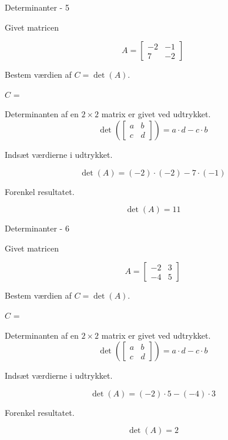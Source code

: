 \documentclass{article}
\begin{document}
\begin{exercise}{Determinanter - 5}
	
	Givet matricen
	
	\[
	A = \left[\begin{array}{rr}
	-2 & -1 \\ 
	7 & -2 
	\end{array} \right]
	\]
	
	Bestem værdien af $C = \det(A)$.
	
	$C$ = 
	
	\hint
	Determinanten af en $2 \times 2$ matrix er givet ved udtrykket.
	\[
	\det \left( \left[\begin{array}{rr}
	a & b \\ 
	c & d 
	\end{array} \right] \right) = a \cdot d - c \cdot b
	\]
	
	\hint
	Indsæt værdierne i udtrykket.
	
	\hint
	\[
	\det \left( A \right) = (-2) \cdot (-2) - 7 \cdot (-1)
	\]
	
	\hint
	Forenkel resultatet.
	
	\hint
	\[
	\det \left( A \right) = 11
	\]
	
	
\end{exercise}


\begin{exercise}{Determinanter - 6}
	
	Givet matricen
	
	\[
	A = \left[\begin{array}{rr}
	-2 & 3 \\ 
	-4 & 5 
	\end{array} \right]
	\]
	
	Bestem værdien af $C = \det(A)$.
	
	$C$ = 
	
	\hint
	Determinanten af en $2 \times 2$ matrix er givet ved udtrykket.
	\[
	\det \left( \left[\begin{array}{rr}
	a & b \\ 
	c & d 
	\end{array} \right] \right) = a \cdot d - c \cdot b
	\]
	
	\hint
	Indsæt værdierne i udtrykket.
	
	\hint
	\[
	\det \left( A \right) = (-2) \cdot 5 - (-4) \cdot 3
	\]
	
	\hint
	Forenkel resultatet.
	
	\hint
	\[
	\det \left( A \right) = 2
	\]
	
\end{exercise}
\end{document}
